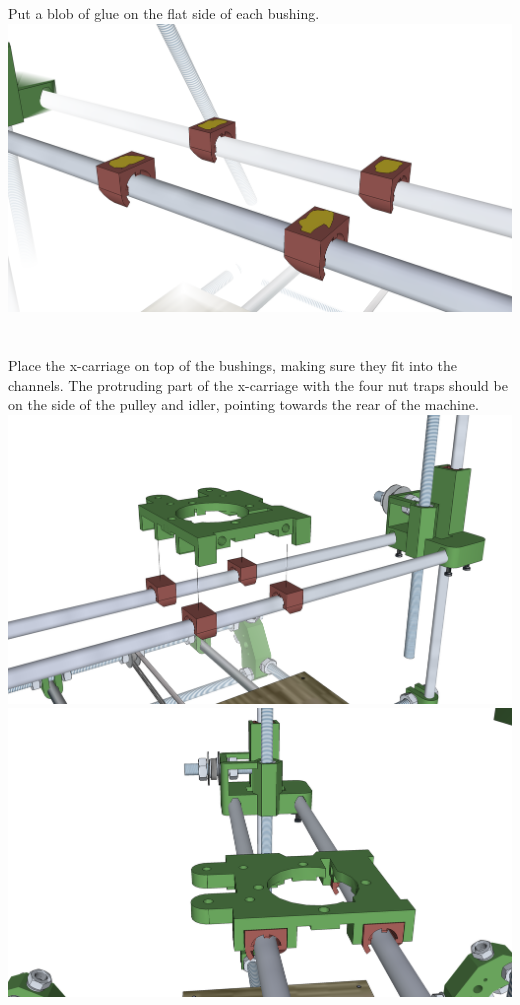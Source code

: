 \documentclass[twoside,openany,a4paper,titlepage]{memoir}
\begin{document}
	\section{}
	Put a blob of glue on the flat side of each bushing.\\
	\includegraphics[width=1\linewidth]{graphics/ch9_8.png}
	
	\section{}
	Place the x-carriage on top of the bushings, making sure they fit into the channels. The protruding part
	of the x-carriage with the four nut traps should be on the side of the pulley and idler, pointing towards
	the rear of the machine.\\
	\includegraphics[width=1\linewidth]{graphics/ch9_9_1.png}
	\includegraphics[width=1\linewidth]{graphics/ch9_9_2.png}
	
\end{document}
